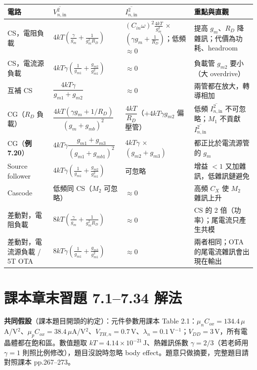 \documentclass[11pt,a4paper]{article}
\newcommand{\Vsq}[1]{\overline{V^2_{n,\text{#1}}}}
\newcommand{\Isq}[1]{\overline{I^2_{n,\text{#1}}}}
\newcommand{\exref}[1]{\textcolor{extag}{\textbf{\sffamily 例 #1}}}
\begin{document}
\begin{tabularx}{\linewidth}{>{\raggedright}p{2.2cm}>{\raggedright}p{4.6cm}>{\raggedright}p{2.7cm}X}
\toprule
電路 & $\Vsq{in}$ & $\Isq{in}$ & 重點與直觀\tabularnewline\midrule
CS，電阻負載 & $4kT\left(\frac{\gamma}{g_m}+\frac{1}{g_m^2R_D}\right)$ & $(C_{in}\omega)^2\frac{4kT}{g_m^2}\,\times$ $(\gamma g_m+\frac1{R_D})$；低頻 $\approx0$ & 提高 $g_m$、$R_D$ 降雜訊；代價為功耗、headroom\tabularnewline
CS，電流源負載 & $4kT\gamma\left(\frac1{g_{m1}}+\frac{g_{m2}}{g_{m1}^2}\right)$ & $\approx0$ & 負載管 $g_{m2}$ 要小（大 overdrive）\tabularnewline
互補 CS & $\dfrac{4kT\gamma}{g_{m1}+g_{m2}}$ & $\approx0$ & 兩管都在放大，轉導相加\tabularnewline
CG（$R_D$ 負載） & $\dfrac{4kT(\gamma g_m+1/R_D)}{(g_m+g_{mb})^2}$ & $\dfrac{4kT}{R_D}$（$+4kT\gamma g_{m2}$ 偏壓管） & 低頻 $\Isq{in}$ 不可忽略；$M_1$ 不貢獻 $\Isq{in}$\tabularnewline
CG（\exref{7.20}） & $4kT\gamma\dfrac{g_{m1}+g_{m3}}{(g_{m1}+g_{mb1})^2}$ & $4kT\gamma\,\times$ $(g_{m2}+g_{m3})$ & 都正比於電流源管的 $g_m$\tabularnewline
Source follower & $4kT\gamma\left(\frac1{g_{m1}}+\frac{g_{m2}}{g_{m1}^2}\right)$ & 可忽略 & 增益 $<1$ 又加雜訊，低雜訊鏈避免\tabularnewline
Cascode & 低頻同 CS（$M_2$ 可忽略） & $\approx0$ & 高頻 $C_X$ 使 $M_2$ 雜訊上升\tabularnewline
差動對，電阻負載 & $8kT\left(\frac{\gamma}{g_m}+\frac{1}{g_m^2R_D}\right)$ & $\approx0$ & CS 的 2 倍（功率）；尾電流只產生共模\tabularnewline
差動對，電流源負載 / 5T OTA & $8kT\gamma\left(\frac1{g_{m1}}+\frac{g_{m3}}{g_{m1}^2}\right)$ & $\approx0$ & 兩者相同；OTA 的尾電流雜訊會出現在輸出\tabularnewline
\bottomrule
\end{tabularx}

\newcommand{\probhead}[2]{\par\bigskip\noindent{\sffamily\bfseries\large 習題 #1}\enspace{\bfseries #2}\par\nopagebreak\smallskip}

\section*{課本章末習題 7.1--7.34 解法}

\textbf{共同假設}（課本題目開頭的約定）：元件參數用課本 Table 2.1：$\mu_nC_{ox}=134.4\,\mu$A/V$^2$、$\mu_pC_{ox}=38.4\,\mu$A/V$^2$、$V_{TH,n}=0.7$\,V、$\lambda_n=0.1\,$V$^{-1}$；$V_{DD}=3$\,V，所有電晶體都在飽和區。數值題取 $kT=4.14\times10^{-21}$\,J、熱雜訊係數 $\gamma=2/3$（若老師用 $\gamma=1$ 則照比例修改），題目沒說時忽略 body effect。題意只做摘要，完整題目請對照課本 pp.267--273。
\end{document}

